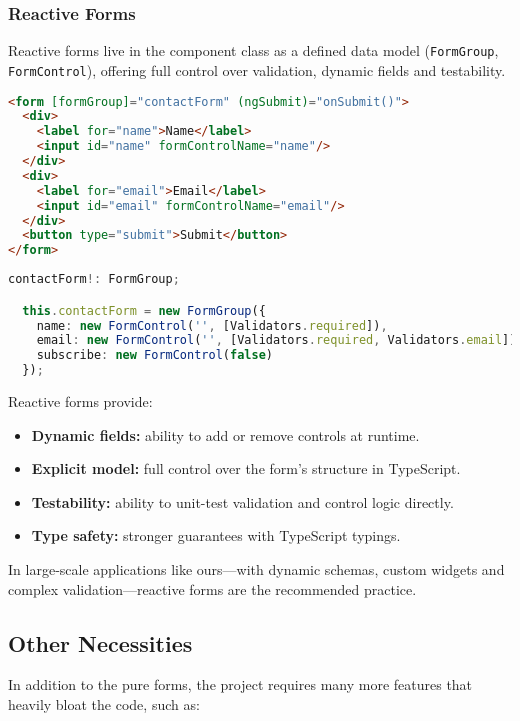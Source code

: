 \subsubsection{Reactive Forms}

Reactive forms live in the component class as a defined data model (\texttt{FormGroup}, \texttt{FormControl}), offering
full control over validation, dynamic fields and testability.

\begin{lstlisting}[language=HTML,caption={Reactive Form HTML}, label={lst:reactiveHTML}]
<form [formGroup]="contactForm" (ngSubmit)="onSubmit()">
  <div>
    <label for="name">Name</label>
    <input id="name" formControlName="name"/>
  </div>
  <div>
    <label for="email">Email</label>
    <input id="email" formControlName="email"/>
  </div>
  <button type="submit">Submit</button>
</form>
\end{lstlisting}

\begin{lstlisting}[language=TypeScript,caption={Reactive Form TS}, label={lst:reactiveTS}]
  contactForm!: FormGroup;

  this.contactForm = new FormGroup({
    name: new FormControl('', [Validators.required]),
    email: new FormControl('', [Validators.required, Validators.email]),
    subscribe: new FormControl(false)
  });
\end{lstlisting}

Reactive forms provide:
\begin{itemize}
  \item \textbf{Dynamic fields:} ability to add or remove controls at runtime.
  \item \textbf{Explicit model:} full control over the form’s structure in TypeScript.
  \item \textbf{Testability:} ability to unit-test validation and control logic directly.
  \item \textbf{Type safety:} stronger guarantees with TypeScript typings.
\end{itemize}

In large‐scale applications like ours—with dynamic schemas, custom widgets and complex validation—reactive forms are
the recommended practice.

\subsection{Other Necessities}
In addition to the pure forms, the project requires many more features that heavily bloat the code, such as:

